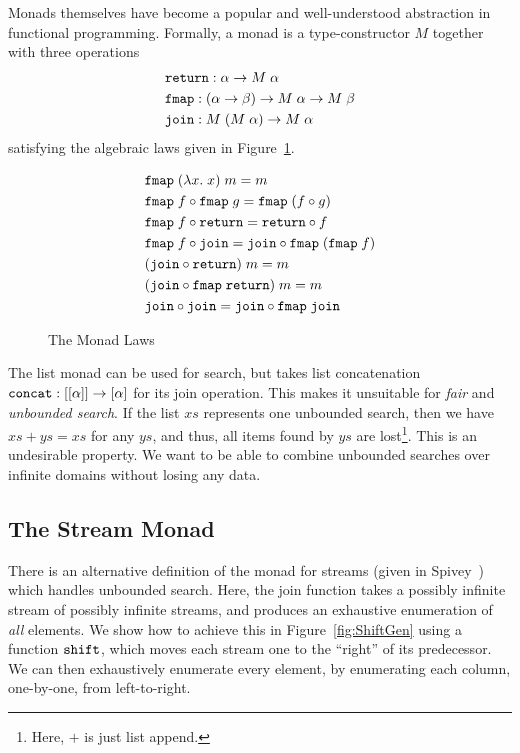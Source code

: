 Monads themselves have become a popular and well-understood abstraction in functional programming. Formally, a monad is a type-constructor $M$ together with three operations 
\begin{align*}
&\texttt{return} : \alpha \rightarrow M\;\alpha\\
&\texttt{fmap} : (\alpha \rightarrow \beta) \rightarrow M\;\alpha \rightarrow M\;\beta\\
&\texttt{join} : M\;(M\;\alpha) \rightarrow M\;\alpha
\end{align*}
satisfying the algebraic laws given in Figure~\ref{fig:MonadLaws}.

\begin{figure}
\begin{align}
&\texttt{fmap}\;(\lambda x.\;x)\;m = m\notag\\
&\texttt{fmap}\;f \circ \texttt{fmap}\;g = \texttt{fmap}\;(f \circ g)\notag\\
&\texttt{fmap}\;f \circ \texttt{return} = \texttt{return}\circ f\notag\\
&\texttt{fmap}\;f \circ \texttt{join} = \texttt{join} \circ \texttt{fmap}\;(\texttt{fmap}\;f)\notag\\
&(\texttt{join} \circ \texttt{return})\;m = m\notag\\
&(\texttt{join} \circ \texttt{fmap}\;\texttt{return})\;m = m\notag\\
&\texttt{join} \circ \texttt{join} = \texttt{join} \circ \texttt{fmap}\;\texttt{join} \label{eq:JoinAssoc}
\end{align}
\caption{The Monad Laws}
\label{fig:MonadLaws}
\end{figure}

The list monad can be used for search, but takes list concatenation $\texttt{concat} : [[\alpha]] \rightarrow [\alpha]$ for its join operation. This makes it unsuitable for \emph{fair} and \emph{unbounded search}. If the list $xs$ represents one unbounded search, then we have $xs + ys = xs$ for any $ys$, and thus, all items found by $ys$ are lost\footnote{Here, $+$ is just list append.}. This is an undesirable property. We want to be able to combine unbounded searches over infinite domains without losing any data.

\subsection{The Stream Monad}\label{sec:StreamMonad}
There is an alternative definition of the monad for streams (given in Spivey~\cite{SearchAlgebras}) which handles unbounded search. Here, the join function takes a possibly infinite stream of possibly infinite streams, and produces an exhaustive enumeration of \emph{all} elements. We show how to achieve this in Figure~\ref{fig:ShiftGen} using a function $\texttt{shift}$, which moves each stream one to the ``right'' of its predecessor. We can then exhaustively enumerate every element, by enumerating each column, one-by-one, from left-to-right. 

